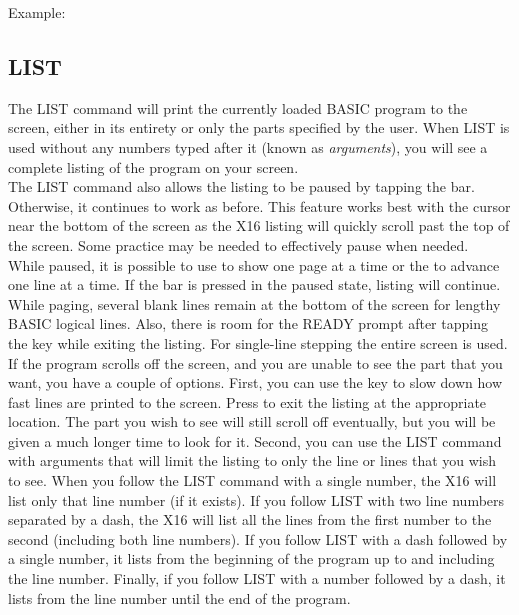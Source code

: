 Example:\\


\subsection{LIST}

The {\ttfamily LIST} command will print the currently loaded BASIC program to
the screen, either in its entirety or only the parts specified by the user.
When {\ttfamily LIST} is used without any numbers typed after it (known as
\emph{arguments}), you will see a complete listing of the program on your
screen.\\

The {\ttfamily LIST} command also allows the listing to be paused by tapping
the  bar.  Otherwise, it continues to work as before.  This
feature works best with the cursor near the bottom of the screen as the X16
listing will quickly scroll past the top of the screen.  Some practice may be
needed to effectively pause when needed.\\

While paused, it is possible to use  to show one page at
a time or the  to advance one line at a time.  If the
 bar is pressed in the paused state, listing will continue.
While paging, several blank lines remain at the bottom of the screen for
lengthy BASIC logical lines.  Also, there is room for the {\ttfamily READY}
prompt after tapping the  key while exiting the
listing.  For single-line stepping the entire screen is used.\\

If the program scrolls off the screen, and you are unable to see the part that
you want, you have a couple of options.  First, you can use the 
key to slow down how fast lines are printed to the screen.  Press
 to exit the listing at the appropriate location.  The
part you wish to see will still scroll off eventually, but you will be given a
much longer time to look for it.  Second, you can use the {\ttfamily LIST}
command with arguments that will limit the listing to only the line or lines
that you wish to see.  When you follow the {\ttfamily LIST} command with a
single number, the X16 will list only that line number (if it exists).  If you
follow {\ttfamily LIST} with two line numbers separated by a dash, the X16 will
list all the lines from the first number to the second (including both line
numbers).  If you follow {\ttfamily LIST} with a dash followed by a single
number, it lists from the beginning of the program up to and including the line
number.  Finally, if you follow {\ttfamily LIST} with a number followed by a
dash, it lists from the line number until the end of the program.\\

